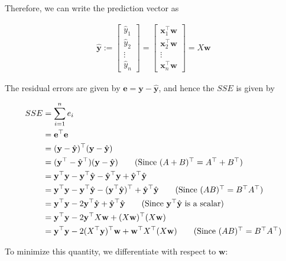\documentclass[12pt]{article}
\begin{document}
\begin{enumerate}
Therefore, we can write the prediction vector as

\begin{align*}
	\hat{\mathbf{y}}
	:=\begin{bmatrix}
		\hat{y}_1\\
		\hat{y}_2\\
		\vdots\\
		\hat{y}_n
	\end{bmatrix}
	=\begin{bmatrix}
		\mathbf{x}_1^\top \mathbf{w}\\
		\mathbf{x}_2^\top \mathbf{w}\\
		\vdots\\
		\mathbf{x}_n^\top \mathbf{w}
	\end{bmatrix}
	=X\mathbf{w}
\end{align*}

The residual errors are given by $\mathbf{e}=\mathbf{y}-\hat{\mathbf{y}}$, and
hence the $SSE$ is given by

\begin{align*}
	SSE &= \sum_{i=1}^{n}e_i\\
	&=\mathbf{e}^\top\mathbf{e}\\
	&=(\mathbf{y}-\hat{\mathbf{y}})^\top (\mathbf{y}-\hat{\mathbf{y}})\\
	&=(\mathbf{y}^\top -\hat{\mathbf{y}}^\top)(\mathbf{y}-\hat{\mathbf{y}})
	\tag{Since $(A+B)^\top=A^\top+B^\top$}\\
	&=\mathbf{y}^\top \mathbf{y}-\mathbf{y}^\top \hat{\mathbf{y}}
	-\hat{\mathbf{y}}^\top \mathbf{y} + \hat{\mathbf{y}}^\top \hat{\mathbf{y}}\\
	&=\mathbf{y}^\top \mathbf{y}-\mathbf{y}^\top \hat{\mathbf{y}}
	-(\mathbf{y}^\top \hat{\mathbf{y}})^\top + \hat{\mathbf{y}}^\top \hat{\mathbf{y}}
	\tag{Since $(AB)^\top=B^\top A^\top$}\\
	&=\mathbf{y}^\top \mathbf{y}-2\mathbf{y}^\top \hat{\mathbf{y}}
	 + \hat{\mathbf{y}}^\top \hat{\mathbf{y}} \tag{Since $\mathbf{y}^\top \hat{\mathbf{y}}$ is a scalar}\\
	&=\mathbf{y}^\top\mathbf{y} - 2\mathbf{y}^\top X\mathbf{w}
	+ (X\mathbf{w})^\top (X\mathbf{w})\\
	&=\mathbf{y}^\top\mathbf{y} - 2 (X^\top \mathbf{y})^\top\mathbf{w}
	+ \mathbf{w}^\top X^\top (X\mathbf{w})
	\tag{Since $(AB)^\top=B^\top A^\top$}
\end{align*}

To minimize this quantity, we differentiate with respect to $\mathbf{w}$:


\end{enumerate}
\end{document}
